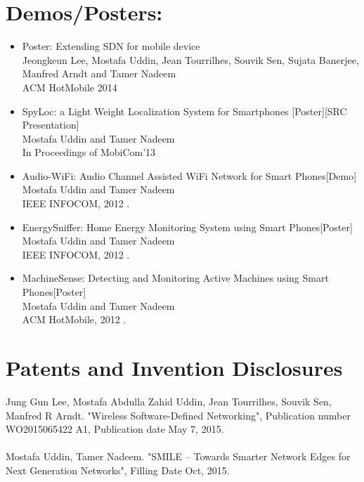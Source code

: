 \documentclass[margin]{res}
\begin{document}
\begin{resume}
\section{Demos/Posters:}
\begin{itemize} \itemsep -2pt

\item Poster: Extending SDN for mobile device \\Jeongkeun Lee,  Mostafa Uddin, Jean Tourrilhes, Souvik Sen, Sujata Banerjee,
Manfred Arndt and Tamer Nadeem \\
		ACM HotMobile 2014

\item SpyLoc: a Light Weight Localization System for Smartphones [Poster][SRC Presentation]\\
Mostafa Uddin and Tamer Nadeem\\ 
In Proceedings of MobiCom'13 

\item Audio-WiFi: Audio Channel Assisted WiFi Network for Smart Phones[Demo]\\ 
Mostafa Uddin and Tamer Nadeem\\ 
IEEE INFOCOM, 2012 . 

\item EnergySniffer: Home Energy Monitoring System using Smart Phones[Poster]\\ 
Mostafa Uddin and Tamer Nadeem\\ 
IEEE INFOCOM, 2012 . 

\item MachineSense: Detecting and Monitoring Active Machines using Smart Phones[Poster]\\ 
Mostafa Uddin and Tamer Nadeem\\ 
ACM HotMobile, 2012 . 

\end{itemize}
 
 

\section{Patents and Invention Disclosures}
Jung Gun Lee, Mostafa Abdulla Zahid Uddin, Jean Tourrilhes, Souvik Sen, Manfred R Arndt. "Wireless Software-Defined Networking", Publication number WO2015065422 A1, Publication date May 7, 2015. \\
\\
Mostafa Uddin, Tamer Nadeem. "SMILE -- Towards Smarter Network Edges for Next Generation Networks", Filling Date Oct, 2015.\\


\end{resume}
\end{document}
